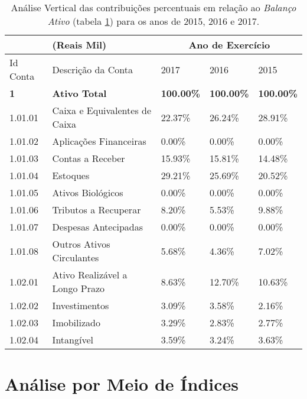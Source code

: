 \begin{center}
\begin{table}[H]
\begin{tabular}{p{}|p{}|p{}|p{}|p{}}
\hline 
 & (Reais Mil) & \multicolumn{3}{c}{Ano de Exercício}\tabularnewline
\hline 
Id Conta & Descrição da Conta & 2017 & 2016 & 2015\tabularnewline
\hline 
\textbf{1} & \textbf{Ativo Total} & \textbf{100.00\%} & \textbf{100.00\%} & \textbf{100.00\%}\tabularnewline
1.01.01 & Caixa e Equivalentes de Caixa & 22.37\% & 26.24\% & 28.91\%\tabularnewline
1.01.02 & Aplicações Financeiras & 0.00\% & 0.00\% & 0.00\%\tabularnewline
1.01.03 & Contas a Receber & 15.93\% & 15.81\% & 14.48\%\tabularnewline
1.01.04 & Estoques & 29.21\% & 25.69\% & 20.52\%\tabularnewline
1.01.05 & Ativos Biológicos & 0.00\% & 0.00\% & 0.00\%\tabularnewline
1.01.06 & Tributos a Recuperar & 8.20\% & 5.53\% & 9.88\%\tabularnewline
1.01.07 & Despesas Antecipadas & 0.00\% & 0.00\% & 0.00\%\tabularnewline
1.01.08 & Outros Ativos Circulantes & 5.68\% & 4.36\% & 7.02\%\tabularnewline
1.02.01 & Ativo Realizável a Longo Prazo & 8.63\% & 12.70\% & 10.63\%\tabularnewline
1.02.02 & Investimentos & 3.09\% & 3.58\% & 2.16\%\tabularnewline
1.02.03 & Imobilizado & 3.29\% & 2.83\% & 2.77\%\tabularnewline
1.02.04 & Intangível & 3.59\% & 3.24\% & 3.63\%\tabularnewline
\hline
\end{tabular}
\caption{\label{tab:balancoAtivo} Análise Vertical das contribuições percentuais em relação ao \emph{Balanço Ativo} (tabela \ref{tab:balancoAtivo}) para  os anos de 2015, 2016 e 2017.}
\end{table}
\vspace*{-40pt}
\par\end{center}


\section{Análise por Meio de Índices}
